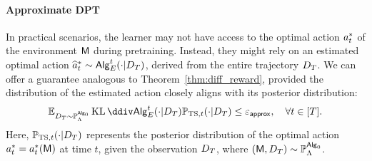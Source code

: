 \paragraph{Approximate DPT} In practical scenarios, the learner may not have access to the optimal action ${a}^*_t$ of the environment ${\mathsf{M}}$ during pretraining. Instead, they might rely on an estimated optimal action $\widehat{{a}}_t^* \sim {\mathsf{Alg}}_{{E}}^t(\cdot | {D}_{T})$, derived from the entire trajectory ${D}_{T}$. We can offer a guarantee analogous to Theorem~\ref{thm:diff_reward}, provided the distribution of the estimated action closely aligns with its posterior distribution: 
\begin{align}\E_{\dset_\totlen\sim\P_{\prior}^{\sAlg_0}}\KL{\sAlg_{\shortexp}^t(\cdot | \dset_\totlen)}{\P_{\TS,t}(\cdot|\dset_\totlen)}\leq\appeps,~~~ \forall t \in [\totlen]. 
\label{eq:app_opt_cond}
\end{align}
Here, $\mathbb{P}_{{\mathrm{TS}},t}(\cdot|{D}_{T})$ represents the posterior distribution of the optimal action ${a}^*_t={a}^*_t({\mathsf{M}})$ at time $t$, given the observation ${D}_{T}$, where $({\mathsf{M}}, {D}_{T}) \sim \mathbb{P}_{\Lambda}^{{\mathsf{Alg}}_0}$. 


